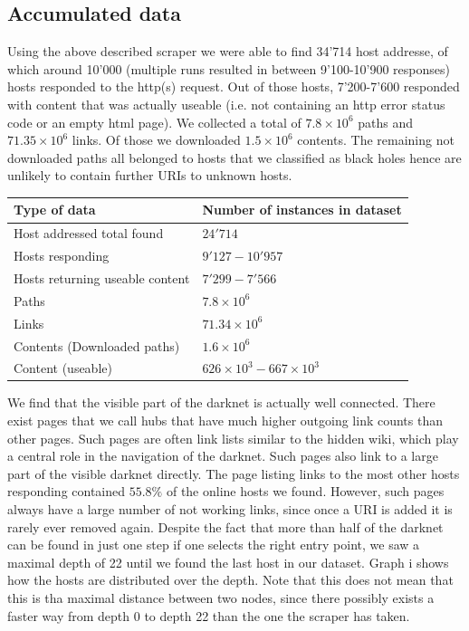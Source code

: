 \documentclass[USenglish,oneside,twocolumn]{article}
\begin{document}
\subsection{Accumulated data}
Using the above described scraper we were able to find 34'714 host addresse, of which around 10'000 (multiple runs resulted in between 9'100-10'900 responses) hosts responded to the http(s) request. Out of those hosts, 7'200-7'600 responded with content that was actually useable (i.e. not containing an http error status code or an empty html page).
We collected a total of $7.8\times10^{6}$ paths and $71.35\times10^{6}$ links. Of those we downloaded $1.5\times10^{6}$ contents. The remaining not downloaded paths all belonged to hosts that we classified as black holes hence are unlikely to contain further URIs to unknown hosts.
\begin{center}
\begin{tabular}{l|l}
Type of data           & Number of instances in dataset  \\
\hline
Host addressed total found      & $24'714$                                   \\
\hline
Hosts responding                & $9'127-10'957$                             \\
\hline
Hosts returning useable content & $7'299 - 7'566$                            \\
\hline
Paths                           & $7.8\times10^{6}$                        \\
\hline
Links                           & $71.34\times10^{6}$                      \\
\hline
Contents (Downloaded paths)     & $1.6\times10^{6}$                        \\
\hline
Content (useable)               & $626\times10^{3} - 667\times10^{3}$      \\
\end{tabular}
\end{center}
We find that the visible part of the darknet is actually well connected. There exist pages that we call hubs that have much higher outgoing link counts than other pages. Such pages are often link lists similar to the hidden wiki, which play a central role in the navigation of the darknet. Such pages also link to a large part of the visible darknet directly. The page listing links to the most other hosts responding contained $55.8\%$ of the online hosts we found. However, such pages always have a large number of not working links, since once a URI is added it is rarely ever removed again.
Despite the fact that more than half of the darknet can be found in just one step if one selects the right entry point, we saw a maximal depth of 22 until we found the last host in our dataset. Graph i shows how the hosts are distributed over the depth.
Note that this does not mean that this is tha maximal distance between two nodes, since there possibly exists a faster way from depth 0 to depth 22 than the one the scraper has taken.
\end{document}
